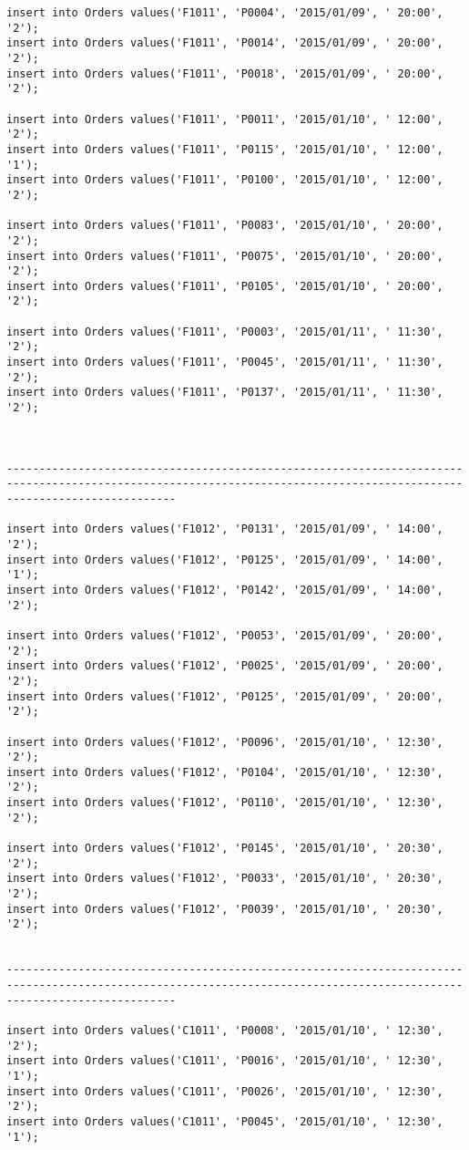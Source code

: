\documentclass[a4,12pt]{report}
\begin{document}
\begin{lstlisting}
insert into Orders values('F1011', 'P0004', '2015/01/09', ' 20:00', '2');
insert into Orders values('F1011', 'P0014', '2015/01/09', ' 20:00', '2');
insert into Orders values('F1011', 'P0018', '2015/01/09', ' 20:00', '2');

insert into Orders values('F1011', 'P0011', '2015/01/10', ' 12:00', '2');
insert into Orders values('F1011', 'P0115', '2015/01/10', ' 12:00', '1');
insert into Orders values('F1011', 'P0100', '2015/01/10', ' 12:00', '2');

insert into Orders values('F1011', 'P0083', '2015/01/10', ' 20:00', '2');
insert into Orders values('F1011', 'P0075', '2015/01/10', ' 20:00', '2');
insert into Orders values('F1011', 'P0105', '2015/01/10', ' 20:00', '2');

insert into Orders values('F1011', 'P0003', '2015/01/11', ' 11:30', '2');
insert into Orders values('F1011', 'P0045', '2015/01/11', ' 11:30', '2');
insert into Orders values('F1011', 'P0137', '2015/01/11', ' 11:30', '2');



----------------------------------------------------------------------------------------------------------------------------------------------------------------------

insert into Orders values('F1012', 'P0131', '2015/01/09', ' 14:00', '2');
insert into Orders values('F1012', 'P0125', '2015/01/09', ' 14:00', '1');
insert into Orders values('F1012', 'P0142', '2015/01/09', ' 14:00', '2');

insert into Orders values('F1012', 'P0053', '2015/01/09', ' 20:00', '2');
insert into Orders values('F1012', 'P0025', '2015/01/09', ' 20:00', '2');
insert into Orders values('F1012', 'P0125', '2015/01/09', ' 20:00', '2');

insert into Orders values('F1012', 'P0096', '2015/01/10', ' 12:30', '2');
insert into Orders values('F1012', 'P0104', '2015/01/10', ' 12:30', '2');
insert into Orders values('F1012', 'P0110', '2015/01/10', ' 12:30', '2');

insert into Orders values('F1012', 'P0145', '2015/01/10', ' 20:30', '2');
insert into Orders values('F1012', 'P0033', '2015/01/10', ' 20:30', '2');
insert into Orders values('F1012', 'P0039', '2015/01/10', ' 20:30', '2');


----------------------------------------------------------------------------------------------------------------------------------------------------------------------

insert into Orders values('C1011', 'P0008', '2015/01/10', ' 12:30', '2');
insert into Orders values('C1011', 'P0016', '2015/01/10', ' 12:30', '1');
insert into Orders values('C1011', 'P0026', '2015/01/10', ' 12:30', '2');
insert into Orders values('C1011', 'P0045', '2015/01/10', ' 12:30', '1');


\end{lstlisting}
\end{document}
